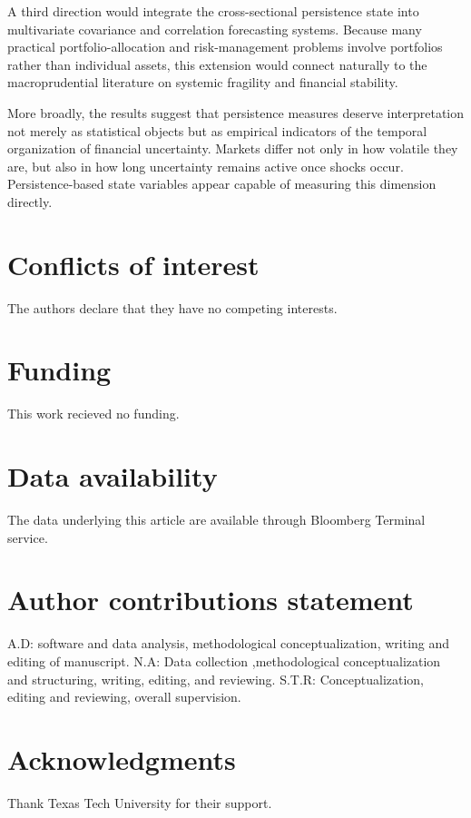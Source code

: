 \documentclass[unnumsec,webpdf,contemporary,large]{oup-authoring-template}%
\theoremstyle{thmstyleone}%
\theoremstyle{thmstyletwo}%
\theoremstyle{thmstylethree}%
\begin{document}
A third direction would integrate the cross-sectional persistence state
into multivariate covariance and correlation forecasting systems. Because
many practical portfolio-allocation and risk-management problems involve
portfolios rather than individual assets, this extension would connect
naturally to the macroprudential literature on systemic fragility and
financial stability.

More broadly, the results suggest that persistence measures deserve
interpretation not merely as statistical objects but as empirical
indicators of the temporal organization of financial uncertainty. Markets
differ not only in how volatile they are, but also in how long uncertainty
remains active once shocks occur. Persistence-based state variables appear
capable of measuring this dimension directly.
\section{Conflicts of interest}
The authors declare that they have no competing interests.

\section{Funding}
This work recieved no funding.

\section{Data availability}
The data underlying this article are available through Bloomberg Terminal service.

\section{Author contributions statement}
A.D: software and data analysis, methodological conceptualization, writing and editing of manuscript.
N.A: Data collection ,methodological conceptualization and structuring, writing, editing, and reviewing.
S.T.R: Conceptualization, editing and reviewing, overall supervision.


\section{Acknowledgments}
Thank Texas Tech University for their support.




\end{document}
